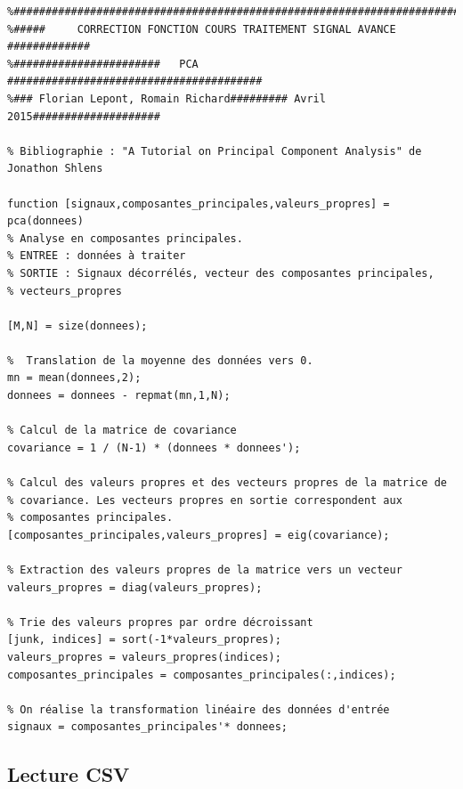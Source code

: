 \begin{verbatim}
%##########################################################################
%#####     CORRECTION FONCTION COURS TRAITEMENT SIGNAL AVANCE #############
%#######################   PCA     ########################################
%### Florian Lepont, Romain Richard######### Avril 2015####################

% Bibliographie : "A Tutorial on Principal Component Analysis" de Jonathon Shlens

function [signaux,composantes_principales,valeurs_propres] = pca(donnees)
% Analyse en composantes principales.
% ENTREE : données à traiter
% SORTIE : Signaux décorrélés, vecteur des composantes principales,
% vecteurs_propres

[M,N] = size(donnees);

%  Translation de la moyenne des données vers 0.
mn = mean(donnees,2);
donnees = donnees - repmat(mn,1,N);

% Calcul de la matrice de covariance
covariance = 1 / (N-1) * (donnees * donnees');

% Calcul des valeurs propres et des vecteurs propres de la matrice de
% covariance. Les vecteurs propres en sortie correspondent aux
% composantes principales.
[composantes_principales,valeurs_propres] = eig(covariance);

% Extraction des valeurs propres de la matrice vers un vecteur
valeurs_propres = diag(valeurs_propres);

% Trie des valeurs propres par ordre décroissant
[junk, indices] = sort(-1*valeurs_propres);
valeurs_propres = valeurs_propres(indices);
composantes_principales = composantes_principales(:,indices);

% On réalise la transformation linéaire des données d'entrée
signaux = composantes_principales'* donnees;
\end{verbatim}




\newpage
\subsection*{Lecture CSV}

